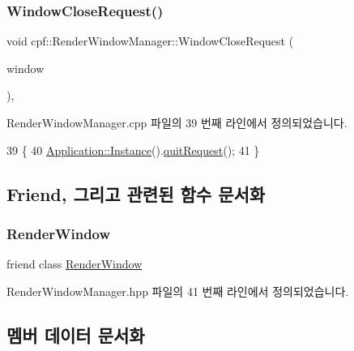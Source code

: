 \subsubsection{\texorpdfstring{Window\+Close\+Request()}{WindowCloseRequest()}}
{\footnotesize\ttfamily void cpf\+::\+Render\+Window\+Manager\+::\+Window\+Close\+Request (\begin{DoxyParamCaption}\item[{G\+L\+F\+Wwindow $\ast$}]{window }\end{DoxyParamCaption})\hspace{0.3cm}{\ttfamily [static]}, {\ttfamily [private]}}



Render\+Window\+Manager.\+cpp 파일의 39 번째 라인에서 정의되었습니다.


\begin{DoxyCode}
39                                                                    \{
40         \hyperlink{classcpf_1_1_t_module_ac8065254584cb0a6656c42f96859d190}{Application::Instance}().\hyperlink{classcpf_1_1_application_ac5c5b81ebccee1f09d777a9fc200eca6}{quitRequest}();
41     \}
\end{DoxyCode}


\subsection{Friend, 그리고 관련된 함수 문서화}
\mbox{\label{classcpf_1_1_render_window_manager_a6752354900753e609e76d5e224630518}} 
\subsubsection{\texorpdfstring{Render\+Window}{RenderWindow}}
{\footnotesize\ttfamily friend class \hyperlink{classcpf_1_1_render_window}{Render\+Window}\hspace{0.3cm}{\ttfamily [friend]}}



Render\+Window\+Manager.\+hpp 파일의 41 번째 라인에서 정의되었습니다.



\subsection{멤버 데이터 문서화}
\mbox{\label{classcpf_1_1_render_window_manager_a9066e525180a325989d0f4f97524d6f6}} 
